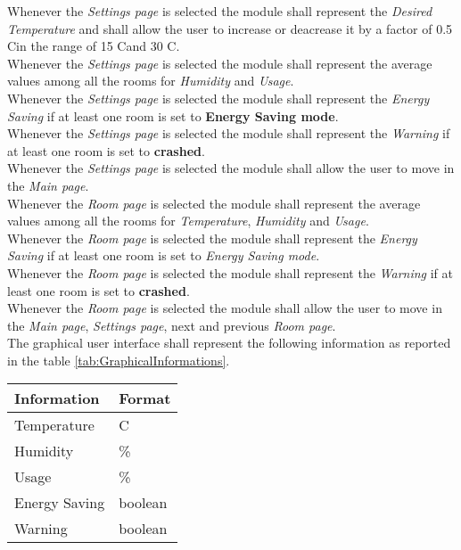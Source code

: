 Whenever the \textit{Settings page} is selected the module shall represent the \textit{Desired Temperature} and shall allow the user to increase or deacrease it by a factor of 0.5 C\degree in the range of 15 C\degree and 30 C\degree.\\
Whenever the \textit{Settings page} is selected the module shall represent the average values among all the rooms for \textit{Humidity} and \textit{Usage}.\\
Whenever the \textit{Settings page} is selected the module shall represent the \textit{Energy Saving} if at least one room is set to \textbf{Energy Saving mode}.\\
Whenever the \textit{Settings page} is selected the module shall represent the \textit{Warning} if at least one room is set to \textbf{crashed}.\\
Whenever the \textit{Settings page} is selected the module shall allow the user to move in the \textit{Main page}.\\

Whenever the \textit{Room page} is selected the module shall represent the average values among all the rooms for \textit{Temperature}, \textit{Humidity} and \textit{Usage}.\\
Whenever the \textit{Room page} is selected the module shall represent the \textit{Energy Saving} if at least one room is set to \textit{Energy Saving mode}.\\
Whenever the \textit{Room page} is selected the module shall represent the \textit{Warning} if at least one room is set to \textbf{crashed}.\\
Whenever the \textit{Room page} is selected the module shall allow the user to move in the \textit{Main page}, \textit{Settings page}, next and previous \textit{Room page}.\\

The graphical user interface shall represent the following information as reported in the table \ref{tab:GraphicalInformations}.
\begin{table}[H]
	\centering
			\begin{tabular}{||l | l||} 
			\hline
			\textbf{Information}	& \textbf{Format} \\ 
			\hline
			Temperature	& C\degree \\ 
			\hline
			Humidity	& \% \\ 
			\hline
			Usage		& \% \\ 
			\hline
			Energy Saving	& boolean \\ 
			\hline
			Warning		& boolean \\ 
			\hline
		\end{tabular}
\end{table}

